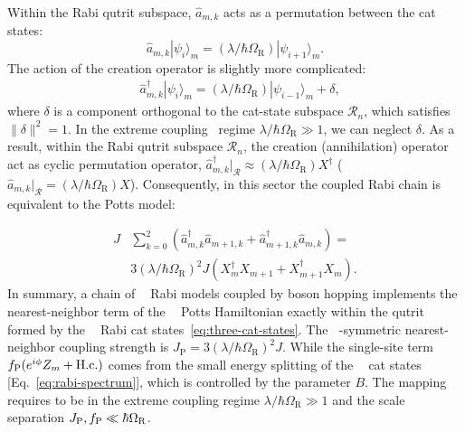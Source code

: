 \documentclass[reprint, aps, prx, amsmath, amssymb, longbibliography, superscriptaddress]{revtex4-2}
\DeclareMathOperator{\Zthree}{\mathbb{Z}_3}
\begin{document}
Within the Rabi qutrit subspace,  $\hat a_{m,k}$ acts as a permutation between the cat states:
\begin{equation}
    \hat a_{m,k} |\psi_i\rangle_m = (\lambda/\hbar \Omega_{\textrm{R}})|\psi_{i+1}\rangle_m. 
\end{equation}
The action of the creation operator is slightly more complicated:
\begin{equation}
\begin{aligned}
    &\hat a_{m,k}^{\dagger} |\psi_i\rangle_m =  (\lambda/\hbar \Omega_{\textrm{R}})|\psi_{i-1}\rangle_m + \delta,
\end{aligned}
\end{equation}
where $\delta$ is a component orthogonal to the cat-state subspace $\mathcal{R}_n$, which satisfies $\lVert \delta\rVert ^2 = 1$. 
In the extreme coupling~\cite{kozin_cavityenhanced_2025,KozinMiserevSchottky} regime $\lambda/\hbar \Omega_{\text{R}} \gg 1$, we can neglect $\delta$. As a result, within the Rabi qutrit subspace $\mathcal{R}_n$, the creation (annihilation) operator act as cyclic permutation operator, $\hat a_{m,k}^{\dagger}|_{\mathcal{R}} \approx (\lambda/\hbar \Omega_{\textrm{R}}) X^{\dagger}$ ($\hat a_{m,k}|_{\mathcal{R}} = (\lambda/\hbar \Omega_{\textrm{R}}) X$). Consequently, in this sector the coupled Rabi chain is equivalent to the Potts model:

\begin{equation}
\begin{aligned}
    J &\sum\limits_{k=0}^{2} \left(\hat a_{m,k}^{\dagger} \hat a_{m+1,k} + \hat a_{m+1,k}^{\dagger} \hat a_{m,k}\right) = \\
    &3(\lambda/\hbar \Omega_{\textrm{R}})^2 J\left(X_m^{\dagger} X_{m+1} + X_{m+1}^{\dagger} X_m\right).
\end{aligned}
\end{equation}
In summary, a chain of $\Zthree$ Rabi models coupled by boson hopping implements the nearest-neighbor term of the $\Zthree$ Potts Hamiltonian exactly within the qutrit formed by the $\Zthree$ Rabi cat states~\eqref{eq:three-cat-states}. The $\Zthree$-symmetric nearest-neighbor coupling strength is $J_{\text{P}} = 3(\lambda/\hbar \Omega_{\textrm{R}})^2 J$. While the single-site term $f_{\text P}(e^{i\phi}Z_m+\mathrm{H.c.})$ comes from the small energy splitting of the $\Zthree$ cat states [Eq.~\eqref{eq:rabi-spectrum}], which is controlled by the parameter $B$. The mapping requires to be in the extreme coupling regime $\lambda/\hbar \Omega_{\mathrm R}\gg 1$ and the scale separation $J_{\text P},f_{\text P}\ll \hbar \Omega_{\text{R}}$. 
\end{document}
